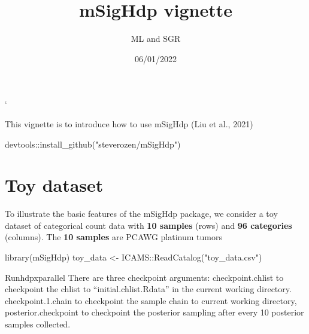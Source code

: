 \documentclass[
]{article}
\title{mSigHdp vignette}
\author{ML and SGR}
\date{06/01/2022}
\newenvironment{Shaded}{\begin{snugshade}}{\end{snugshade}}
\newcommand{\FunctionTok}[1]{\textcolor[rgb]{0.00,0.00,0.00}{#1}}
\newcommand{\NormalTok}[1]{#1}
\newcommand{\OtherTok}[1]{\textcolor[rgb]{0.56,0.35,0.01}{#1}}
\newcommand{\SpecialCharTok}[1]{\textcolor[rgb]{0.00,0.00,0.00}{#1}}
\newcommand{\StringTok}[1]{\textcolor[rgb]{0.31,0.60,0.02}{#1}}
\begin{document}
\maketitle

`

This vignette is to introduce how to use mSigHdp (Liu et al., 2021)

\begin{Shaded}
\begin{Highlighting}[]
\NormalTok{devtools}\SpecialCharTok{::}\FunctionTok{install\_github}\NormalTok{(}\StringTok{"steverozen/mSigHdp"}\NormalTok{)}
\end{Highlighting}
\end{Shaded}

\hypertarget{toy-dataset}{%
\section{Toy dataset}\label{toy-dataset}}

To illustrate the basic features of the mSigHdp package, we consider a
toy dataset of categorical count data with \textbf{10 samples} (rows)
and \textbf{96 categories} (columns). The \textbf{10 samples} are PCAWG
platinum tumors

\begin{Shaded}
\begin{Highlighting}[]
\FunctionTok{library}\NormalTok{(mSigHdp)}
\NormalTok{toy\_data }\OtherTok{\textless{}{-}}\NormalTok{ ICAMS}\SpecialCharTok{::}\FunctionTok{ReadCatalog}\NormalTok{(}\StringTok{"toy\_data.csv"}\NormalTok{)}
\end{Highlighting}
\end{Shaded}

Runhdpxparallel There are three checkpoint arguments: checkpoint.chlist
to checkpoint the chlist to ``initial.chlist.Rdata'' in the current
working directory. checkpoint.1.chain to checkpoint the sample chain to
current working directory, posterior.checkpoint to checkpoint the
posterior sampling after every 10 posterior samples collected.
\end{document}
